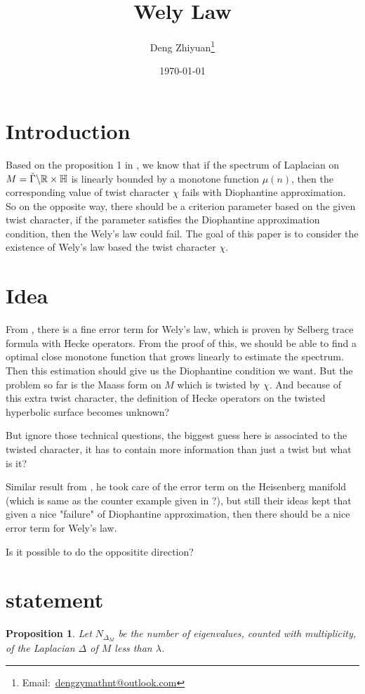 \documentclass[12pt,a4paper,english]{article}
\title{Wely Law}
\date{\today}
\author{Deng Zhiyuan\footnote{Email:\ \href{mailto:dengzymathnt@outlook.com}{dengzymathnt@outlook.com}}}
\theoremstyle{plain}
\newtheorem{prop}[thm]{Proposition}
\theoremstyle{definition}
\theoremstyle{remark}
\begin{document}
\maketitle
\newpage

\tableofcontents
\newpage

\section{Introduction}
Based on the proposition 1 in \cite{hoffmann1991cuspidal}, we know that if the spectrum of Laplacian on $M=\Tilde{\Gamma}\backslash\mathbb{R}\times\mathbb{H}$ is linearly bounded by a monotone function $\mu(n)$, then the corresponding value of twist character $\chi$ fails with Diophantine approximation.  So on the opposite way, there should be a criterion parameter based on the given twist character, if the parameter satisfies the Diophantine approximation condition, then the Wely's law could fail. The goal of this paper is to consider the existence of Wely's law based the twist character $\chi$.

\section{Idea}

From \cite{finis2021remainder}, there is a fine error term for Wely's law, which is proven by Selberg trace formula with Hecke operators. From the proof of this, we should be able to find a optimal close monotone function that grows linearly to estimate the spectrum. Then this estimation should give us the Diophantine condition we want. But the problem so far is the Maass form on $M$ which is twisted by $\chi$. And because of this extra twist character, the definition of Hecke operators on the twisted hyperbolic surface becomes unknown?

But ignore those technical questions, the biggest guess here is associated to the twisted character, it has to contain more information than just a twist but what is it? 

Similar result from \cite{khosravi2005remainder}, he took care of the error term on the Heisenberg manifold (which is same as the counter example given in \cite{hoffmann1991cuspidal}?), but still their ideas kept that given a nice "failure" of Diophantine approximation, then there should be a nice error term for Wely's law. 

Is it possible to do the oppositite direction? 

\section{statement}
\begin{prop}
Let $N_{\Delta_{M}}$ be the number of eigenvalues, counted with multiplicity, of the Laplacian $\Delta$ of $M$ less than $\lambda$.   
\end{prop}
\newpage


\end{document}
